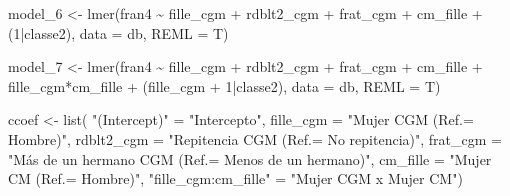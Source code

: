 \documentclass[
  12pt,
  a4paper,
]{article}
\newenvironment{Shaded}{\begin{snugshade}}{\end{snugshade}}
\newcommand{\AttributeTok}[1]{\textcolor[rgb]{0.77,0.63,0.00}{#1}}
\newcommand{\DecValTok}[1]{\textcolor[rgb]{0.00,0.00,0.81}{#1}}
\newcommand{\FunctionTok}[1]{\textcolor[rgb]{0.00,0.00,0.00}{#1}}
\newcommand{\NormalTok}[1]{#1}
\newcommand{\OtherTok}[1]{\textcolor[rgb]{0.56,0.35,0.01}{#1}}
\newcommand{\SpecialCharTok}[1]{\textcolor[rgb]{0.00,0.00,0.00}{#1}}
\newcommand{\StringTok}[1]{\textcolor[rgb]{0.31,0.60,0.02}{#1}}
\begin{document}
\begin{Shaded}
\begin{Highlighting}[]
\NormalTok{model\_6 }\OtherTok{\textless{}{-}} \FunctionTok{lmer}\NormalTok{(fran4 }\SpecialCharTok{\textasciitilde{}}\NormalTok{ fille\_cgm }\SpecialCharTok{+}\NormalTok{ rdblt2\_cgm }\SpecialCharTok{+}\NormalTok{ frat\_cgm }\SpecialCharTok{+}\NormalTok{ cm\_fille }\SpecialCharTok{+}\NormalTok{ (}\DecValTok{1}\SpecialCharTok{|}\NormalTok{classe2), }
                \AttributeTok{data =}\NormalTok{ db,}
                \AttributeTok{REML =}\NormalTok{ T)}

\NormalTok{model\_7 }\OtherTok{\textless{}{-}} \FunctionTok{lmer}\NormalTok{(fran4 }\SpecialCharTok{\textasciitilde{}}\NormalTok{ fille\_cgm }\SpecialCharTok{+}\NormalTok{ rdblt2\_cgm }\SpecialCharTok{+}\NormalTok{ frat\_cgm }\SpecialCharTok{+}\NormalTok{ cm\_fille }\SpecialCharTok{+} 
\NormalTok{                  fille\_cgm}\SpecialCharTok{*}\NormalTok{cm\_fille }\SpecialCharTok{+}\NormalTok{ (fille\_cgm }\SpecialCharTok{+} \DecValTok{1}\SpecialCharTok{|}\NormalTok{classe2), }
                \AttributeTok{data =}\NormalTok{ db,}
                \AttributeTok{REML =}\NormalTok{ T)}

\NormalTok{ccoef }\OtherTok{\textless{}{-}} \FunctionTok{list}\NormalTok{(}
  \StringTok{"(Intercept)"} \OtherTok{=} \StringTok{"Intercepto"}\NormalTok{,}
  \AttributeTok{fille\_cgm =} \StringTok{"Mujer CGM (Ref.= Hombre)"}\NormalTok{,}
  \AttributeTok{rdblt2\_cgm =} \StringTok{"Repitencia CGM (Ref.= No repitencia)"}\NormalTok{,}
  \AttributeTok{frat\_cgm =} \StringTok{"Más de un hermano CGM (Ref.= Menos de un hermano)"}\NormalTok{,}
  \AttributeTok{cm\_fille =} \StringTok{"Mujer CM (Ref.= Hombre)"}\NormalTok{,}
  \StringTok{"fille\_cgm:cm\_fille"} \OtherTok{=} \StringTok{"Mujer CGM x Mujer CM"}\NormalTok{)}


\end{Highlighting}
\end{Shaded}
\end{document}
